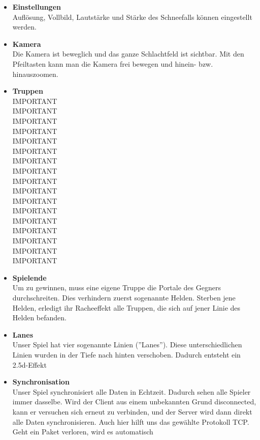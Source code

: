 \begin{itemize}
\begin{itemize}
        \end{itemize}
    \item \textbf{Einstellungen} \\
        Auflösung, Vollbild, Lautstärke und Stärke des Schneefalls können eingestellt werden.
    \item \textbf{Kamera} \\
        Die Kamera ist beweglich und das ganze Schlachtfeld ist sichtbar. Mit den Pfeiltasten kann man die Kamera frei bewegen und hinein- bzw. hinauszoomen.
    \item \textbf{Truppen} \\
        IMPORTANT\\
        IMPORTANT\\
        IMPORTANT\\
        IMPORTANT\\
        IMPORTANT\\
        IMPORTANT\\
        IMPORTANT\\
        IMPORTANT\\
        IMPORTANT\\
        IMPORTANT\\
        IMPORTANT\\
        IMPORTANT\\
        IMPORTANT\\
        IMPORTANT\\
        IMPORTANT\\
        IMPORTANT\\
        IMPORTANT\\
    \item \textbf{Spielende} \\
        Um zu gewinnen, muss eine eigene Truppe die Portale des Gegners durchschreiten. Dies verhindern zuerst sogenannte Helden. Sterben jene Helden, erledigt ihr Racheeffekt alle
        Truppen, die sich auf jener Linie des Helden befanden.
    \item \textbf{Lanes} \\
        Unser Spiel hat vier sogenannte Linien (''Lanes''). Diese unterschiedlichen Linien wurden in der Tiefe nach hinten verschoben. Dadurch entsteht ein 2.5d-Effekt
    \item \textbf{Synchronisation} \\
        Unser Spiel synchronisiert alle Daten in Echtzeit. Dadurch sehen alle Spieler immer dasselbe. Wird der Client aus einem unbekannten Grund disconnected, kann er versuchen
        sich erneut zu verbinden, und der Server wird dann direkt alle Daten synchronisieren. Auch hier hilft uns das gewählte Protokoll TCP. Geht ein Paket verloren, wird es automatisch

\end{itemize}
